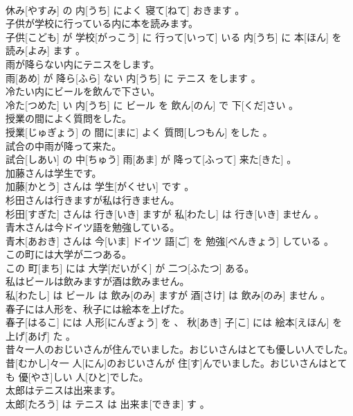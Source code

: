 \documentclass[8pt]{extreport}
\begin{document}
\begin{CJK}{UTF8}{min}
\\	休み[やすみ] の 内[うち] によく 寝て[ねて] おきます 。
\\	子供が学校に行っている内に本を読みます。	
\\	子供[こども] が 学校[がっこう] に 行って[いって] いる 内[うち] に 本[ほん] を 読み[よみ] ます 。
\\	雨が降らない内にテニスをします。	
\\	雨[あめ] が 降ら[ふら] ない 内[うち] に テニス をします 。
\\	冷たい内にビールを飲んで下さい。	
\\	冷た[つめた] い 内[うち] に ビール を 飲ん[のん] で 下[くだ]さい 。
\\	授業の間によく質問をした。	
\\	授業[じゅぎょう] の 間に[まに] よく 質問[しつもん] をした 。
\\	試合の中雨が降って来た。	
\\	試合[しあい] の 中[ちゅう] 雨[あま] が 降って[ふって] 来た[きた] 。
\\	加藤さんは学生です。	
\\	加藤[かとう] さんは 学生[がくせい] です 。
\\	杉田さんは行きますが私は行きません。	
\\	杉田[すぎた] さんは 行き[いき] ますが 私[わたし] は 行き[いき] ません 。
\\	青木さんは今ドイツ語を勉強している。	
\\	青木[あおき] さんは 今[いま] ドイツ 語[ご] を 勉強[べんきょう] している 。
\\	この町には大学が二つある。	
\\	この 町[まち] には 大学[だいがく] が 二つ[ふたつ] ある。
\\	私はビールは飲みますが酒は飲みません。	
\\	私[わたし] は ビール は 飲み[のみ] ますが 酒[さけ] は 飲み[のみ] ません 。
\\	春子には人形を、秋子には絵本を上げた。	
\\	春子[はるこ] には 人形[にんぎょう] を 、 秋[あき] 子[こ] には 絵本[えほん] を 上げ[あげ] た 。
\\	昔々一人のおじいさんが住んでいました。おじいさんはとても優しい人でした。	
\\	昔[むかし]々一 人[にん]のおじいさんが 住[す]んでいました。おじいさんはとても 優[やさ]しい 人[ひと]でした。
\\	太郎はテニスは出来ます。	
\\	太郎[たろう] は テニス は 出来ま[できま] す 。

\end{CJK}
\end{document}
